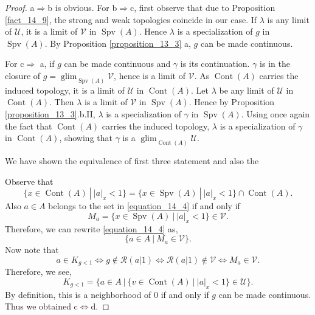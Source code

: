 \documentclass[8pt]{article}
\numberwithin{equation}{section}
\DeclareMathOperator{\glim}{glim}
\DeclareMathOperator{\Spv}{Spv}
\DeclareMathOperator{\Cont}{Cont}
\newcommand{\U}[0]{\mathcal{U}}
\newcommand{\cR}[0]{\mathcal{R}}
\newcommand{\sep}[0]{\:|\:}
\newcommand{\ab}[1]{\vert #1 \vert}
\newcommand{\cV}[0]{\mathcal{V}}
\begin{document}
\begin{proof}
    a$\Rightarrow$b is obvious. For b$\Rightarrow$c, first observe that due to Proposition \ref{fact_14_9}, the strong and weak topologies coincide in our case. If $\lambda$ is any limit of $\U$, it is a limit of $\cV$ in $\Spv(A)$. %
    Hence $\lambda$ is a specialization of $g$ in $\Spv(A)$. By Proposition \ref{proposition_13_3} a, $g$ can be made continuous.
    \par For c$\Rightarrow $ a, if $g$ can be made continuous and $\gamma$ is its continuation. $\gamma$ is in the closure of $g=\glim_{\Spv(A)}\cV$, hence is a limit of $\cV$. As $\Cont(A)$ carries the induced topology, it is a limit of $\U$ in $\Cont(A)$. Let $\lambda$ be any limit of $\U$ in $\Cont(A)$. Then $\lambda$ is a limit of $\cV$ in $\Spv(A)$. Hence by Proposition \ref{proposition_13_3}.b.II, $\lambda$ is a specialization of $\gamma$ in $\Spv(A)$. Using once again the fact that $\Cont(A)$ carries the induced topology, $\lambda$ is a specialization of $\gamma$ in $\Cont(A)$, showing that $\gamma$ is a $\glim_{\Cont(A)}\U$. 
    \par We have shown the equivalence of first three statement and also the 
    \par Observe that
    \begin{equation*}
        \{x\in\Cont(A)\sep \ab{a}_x<1\} = \{x\in\Spv(A)\sep \ab{a}_x<1\}\cap\Cont(A).
    \end{equation*}
    Also $a\in A$ belongs to the set in \eqref{equation_14_4} if and only if 
    \begin{equation*}
        M_a = \{x\in\Spv(A)\sep \ab{a}_x<1\}\in\cV.
    \end{equation*}Therefore, we can rewrite \eqref{equation_14_4} as, 
    \begin{equation*}
        \{a\in A\sep M_a\in\cV\}.
    \end{equation*}
    Now note that 
    \begin{equation*}
        a\in K_{g<1}\Leftrightarrow g\not\in\cR(a|1)\Leftrightarrow \cR(a|1)\not\in \mathcal{V}\Leftrightarrow M_a\in\mathcal{V}.
    \end{equation*}
    Therefore, we see,
    \begin{equation*}
        K_{g<1} = \{a\in A\sep \{v\in\Cont(A)\sep \ab{a}_x<1\}\in\U\}.
    \end{equation*}
    By definition, this is a neighborhood of $0$ if and only if $g$ can be made continuous. Thus we obtained c$\Leftrightarrow$d.

\end{proof}
\end{document}
